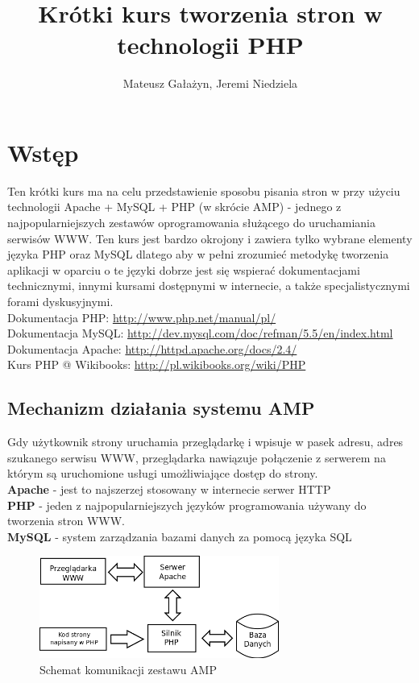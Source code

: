 \documentclass[a4paper,10pt]{article}
\author{Mateusz Gałażyn, Jeremi Niedziela}
\title{Krótki kurs tworzenia stron w technologii PHP}
\begin{document}
\pagestyle{fancy}


\maketitle
\section{Wstęp}
Ten krótki kurs ma na celu przedstawienie sposobu pisania stron w przy użyciu technologii Apache + MySQL + PHP (w skrócie AMP) - jednego z najpopularniejszych zestawów oprogramowania służącego do uruchamiania serwisów WWW. Ten kurs jest bardzo okrojony i zawiera tylko wybrane elementy języka PHP oraz MySQL dlatego aby w pełni zrozumieć metodykę tworzenia aplikacji w oparciu o te  języki dobrze jest się wspierać dokumentacjami technicznymi, innymi kursami dostępnymi w internecie, a także specjalistycznymi forami dyskusyjnymi. \\
Dokumentacja PHP: \href{http://www.php.net/manual/pl/}{http://www.php.net/manual/pl/} \\
Dokumentacja MySQL: \href{http://dev.mysql.com/doc/refman/5.5/en/index.html}{http://dev.mysql.com/doc/refman/5.5/en/index.html} \\
Dokumentacja Apache: \href{http://httpd.apache.org/docs/2.4/}{http://httpd.apache.org/docs/2.4/} \\
Kurs PHP @ Wikibooks: \href{http://pl.wikibooks.org/wiki/PHP}{http://pl.wikibooks.org/wiki/PHP}

\subsection{Mechanizm działania systemu AMP} 
Gdy użytkownik strony uruchamia przeglądarkę i wpisuje w pasek adresu, adres szukanego serwisu WWW, przeglądarka nawiązuje połączenie z serwerem na którym są uruchomione usługi umożliwiające dostęp do strony. \\
\textbf{Apache} - jest to najszerzej stosowany w internecie serwer HTTP \\
\textbf{PHP} - jeden z najpopularniejszych języków programowania używany do tworzenia stron WWW. \\
\textbf{MySQL} - system zarządzania bazami danych za pomocą języka SQL \\


\begin{figure}[htbp]
\centering
\includegraphics[width=0.7\textwidth]{LAMP.png}
\caption{Schemat komunikacji zestawu AMP}
\end{figure}
\end{document}
